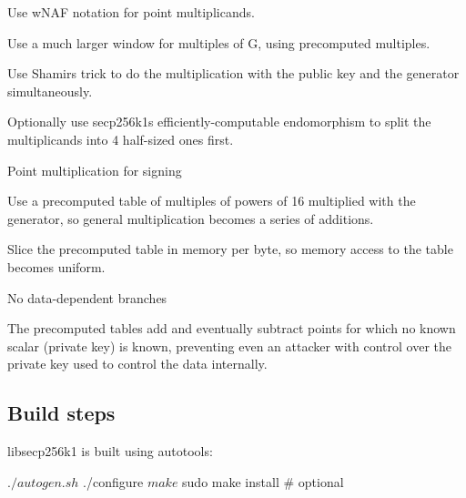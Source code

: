 \begin{DoxyItemize}
\begin{DoxyItemize}
\item Use w\+N\+AF notation for point multiplicands.
\item Use a much larger window for multiples of G, using precomputed multiples.
\item Use Shamir\textquotesingle{}s trick to do the multiplication with the public key and the generator simultaneously.
\item Optionally use secp256k1\textquotesingle{}s efficiently-\/computable endomorphism to split the multiplicands into 4 half-\/sized ones first.
\end{DoxyItemize}
\item Point multiplication for signing
\begin{DoxyItemize}
\item Use a precomputed table of multiples of powers of 16 multiplied with the generator, so general multiplication becomes a series of additions.
\item Slice the precomputed table in memory per byte, so memory access to the table becomes uniform.
\item No data-\/dependent branches
\item The precomputed tables add and eventually subtract points for which no known scalar (private key) is known, preventing even an attacker with control over the private key used to control the data internally.
\end{DoxyItemize}
\end{DoxyItemize}

\subsection*{Build steps }

libsecp256k1 is built using autotools\+: \begin{DoxyVerb}$ ./autogen.sh
$ ./configure
$ make
$ sudo make install  # optional
\end{DoxyVerb}
 